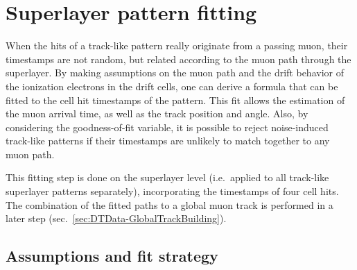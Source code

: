 \FloatBarrier
\section{Superlayer pattern fitting}
\label{sec:DTData-SLPatternFitting}
When the hits of a track-like pattern really originate from a passing muon, their timestamps are not random, but related according to the muon path through the superlayer. By making assumptions on the muon path and the drift behavior of the ionization electrons in the drift cells, one can derive a formula that can be fitted to the cell hit timestamps of the pattern. This fit allows the estimation of the muon arrival time, as well as the track position and angle. Also, by considering the goodness-of-fit variable, it is possible to reject noise-induced track-like patterns if their timestamps are unlikely to match together to any muon path.
\par This fitting step is done on the superlayer level (i.e.\ applied to all track-like superlayer patterns separately), incorporating the timestamps of four cell hits. The combination of the fitted paths to a global muon track is performed in a later step (sec.\ \ref{sec:DTData-GlobalTrackBuilding}).

\subsection{Assumptions and fit strategy}
\label{sec:DTData-SLPatternFitting-Strategy}

